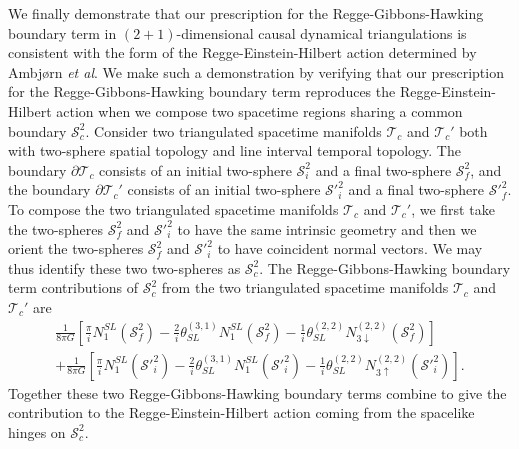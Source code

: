 \documentclass{article}
\begin{document}
We finally demonstrate that our prescription for the
Regge-Gibbons-Hawking boundary term in $(2+1)$-dimensional causal
dynamical triangulations is consistent with the form of the
Regge-Einstein-Hilbert action determined by Ambj\o rn \emph{et al}. We
make such a demonstration by verifying that our prescription for the
Regge-Gibbons-Hawking boundary term reproduces the
Regge-Einstein-Hilbert action when we compose two spacetime regions
sharing a common boundary $\mathcal{S}_{c}^{2}$. Consider two
triangulated spacetime manifolds $\mathcal{T}_{c}$ and
$\mathcal{T}_{c}'$ both with two-sphere spatial topology and line
interval temporal topology. The boundary $\partial\mathcal{T}_{c}$
consists of an initial two-sphere $\mathcal{S}_{i}^{2}$ and a final
two-sphere $\mathcal{S}_{f}^{2}$, and the boundary
$\partial\mathcal{T}_{c}'$ consists of an initial two-sphere
$\mathcal{S'}_{i}^{2}$ and a final two-sphere
$\mathcal{S'}_{f}^{2}$. To compose the two triangulated spacetime
manifolds $\mathcal{T}_{c}$ and $\mathcal{T}_{c}'$, we first take the
two-spheres $\mathcal{S}_{f}^{2}$ and $\mathcal{S'}_{i}^{2}$ to have
the same intrinsic geometry and then we orient the two-spheres
$\mathcal{S}_{f}^{2}$ and $\mathcal{S'}_{i}^{2}$ to have coincident
normal vectors. We may thus identify these two two-spheres as
$\mathcal{S}_{c}^{2}$. The Regge-Gibbons-Hawking boundary term
contributions of $\mathcal{S}_{c}^{2}$ from the two triangulated
spacetime manifolds $\mathcal{T}_{c}$ and $\mathcal{T}_{c}'$ are
\begin{eqnarray}
\frac{1}{8\pi G}\left[\frac{\pi}{i} N_{1}^{SL}(\mathcal{S}_{f}^{2})-\frac{2}{i}\theta_{SL}^{(3,1)}N_{1}^{SL}(\mathcal{S}_{f}^{2})-\frac{1}{i}\theta_{SL}^{(2,2)}N_{3\downarrow}^{(2,2)}(\mathcal{S}_{f}^{2})\right]\nonumber\\+\frac{1}{8\pi G}\left[\frac{\pi}{i} N_{1}^{SL}(\mathcal{S'}_{i}^{2})-\frac{2}{i}\theta_{SL}^{(3,1)}N_{1}^{SL}(\mathcal{S'}_{i}^{2})-\frac{1}{i}\theta_{SL}^{(2,2)}N_{3\uparrow}^{(2,2)}(\mathcal{S'}_{i}^{2})\right].
\end{eqnarray}
Together these two Regge-Gibbons-Hawking boundary terms combine to give the contribution to the Regge-Einstein-Hilbert action coming from the spacelike hinges on $\mathcal{S}_{c}^{2}$.



\end{document}
